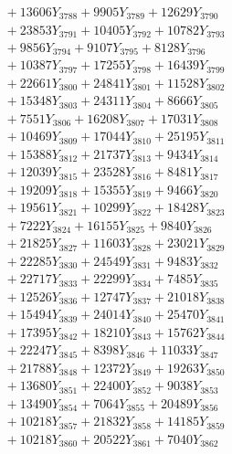 \documentclass[a4paper,10pt]{article}
\begin{document}
{\begin{align}
&\;  + 13606 Y_{3788} + 9905 Y_{3789} + 12629 Y_{3790} \\[0.3ex]
&\;  + 23853 Y_{3791} + 10405 Y_{3792} + 10782 Y_{3793} \\[0.3ex]
&\;  + 9856 Y_{3794} + 9107 Y_{3795} + 8128 Y_{3796} \\[0.3ex]
&\;  + 10387 Y_{3797} + 17255 Y_{3798} + 16439 Y_{3799} \\[0.3ex]
&\;  + 22661 Y_{3800} + 24841 Y_{3801} + 11528 Y_{3802} \\[0.3ex]
&\;  + 15348 Y_{3803} + 24311 Y_{3804} + 8666 Y_{3805} \\[0.3ex]
&\;  + 7551 Y_{3806} + 16208 Y_{3807} + 17031 Y_{3808} \\[0.5ex]\allowbreak
&\;  + 10469 Y_{3809} + 17044 Y_{3810} + 25195 Y_{3811} \\[0.3ex]
&\;  + 15388 Y_{3812} + 21737 Y_{3813} + 9434 Y_{3814} \\[0.3ex]
&\;  + 12039 Y_{3815} + 23528 Y_{3816} + 8481 Y_{3817} \\[0.3ex]
&\;  + 19209 Y_{3818} + 15355 Y_{3819} + 9466 Y_{3820} \\[0.3ex]
&\;  + 19561 Y_{3821} + 10299 Y_{3822} + 18428 Y_{3823} \\[0.3ex]
&\;  + 7222 Y_{3824} + 16155 Y_{3825} + 9840 Y_{3826} \\[0.3ex]
&\;  + 21825 Y_{3827} + 11603 Y_{3828} + 23021 Y_{3829} \\[0.3ex]
&\;  + 22285 Y_{3830} + 24549 Y_{3831} + 9483 Y_{3832} \\[0.3ex]
&\;  + 22717 Y_{3833} + 22299 Y_{3834} + 7485 Y_{3835} \\[0.3ex]
&\;  + 12526 Y_{3836} + 12747 Y_{3837} + 21018 Y_{3838} \\[0.5ex]\allowbreak
&\;  + 15494 Y_{3839} + 24014 Y_{3840} + 25470 Y_{3841} \\[0.3ex]
&\;  + 17395 Y_{3842} + 18210 Y_{3843} + 15762 Y_{3844} \\[0.3ex]
&\;  + 22247 Y_{3845} + 8398 Y_{3846} + 11033 Y_{3847} \\[0.3ex]
&\;  + 21788 Y_{3848} + 12372 Y_{3849} + 19263 Y_{3850} \\[0.3ex]
&\;  + 13680 Y_{3851} + 22400 Y_{3852} + 9038 Y_{3853} \\[0.3ex]
&\;  + 13490 Y_{3854} + 7064 Y_{3855} + 20489 Y_{3856} \\[0.3ex]
&\;  + 10218 Y_{3857} + 21832 Y_{3858} + 14185 Y_{3859} \\[0.3ex]
&\;  + 10218 Y_{3860} + 20522 Y_{3861} + 7040 Y_{3862} \\[0.3ex]

\end{align}}
\end{document}
